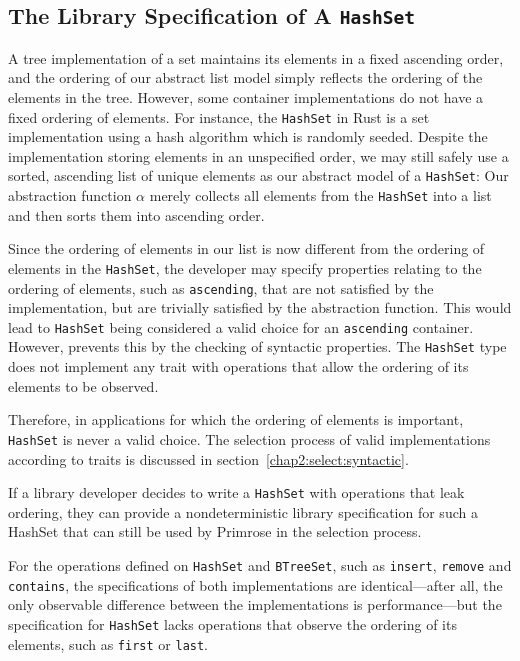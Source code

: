 \subsection{The Library Specification of A \texttt{HashSet}}
\label{lib:hashset}
A tree implementation of a set maintains its elements in a fixed ascending order, and the ordering of our abstract list model simply reflects the ordering of the elements in the tree. However, some container implementations
do not have a fixed ordering of elements. For instance, the \lstinline|HashSet| in Rust is a set implementation 
using a hash algorithm which is randomly seeded. Despite the implementation storing elements in an unspecified order, we may still safely 
use a sorted, ascending list of unique elements as our abstract model of a \lstinline|HashSet|: Our abstraction function $\alpha$ merely collects all elements from the \lstinline|HashSet| into a list and then sorts them into ascending order.

Since the ordering of elements in our list is now different from the ordering of elements in the \lstinline|HashSet|, the developer may specify 
properties relating to the ordering of elements, such as \lstinline|ascending|, that are not satisfied by the implementation, but are trivially satisfied by the 
abstraction function. This would lead to \lstinline|HashSet| being considered a valid choice for an \lstinline|ascending| container.
However, \Primrose{} prevents this by the checking of syntactic properties. The \lstinline|HashSet| type does not implement any trait with operations that allow the ordering of its elements to be observed. 

Therefore, in applications for which the ordering of elements is important, \lstinline|HashSet| is never a valid choice. The selection process of valid implementations according to traits is discussed in section~\ref{chap2:select:syntactic}. 

If a library developer decides to write a \lstinline|HashSet| with operations that leak ordering, they can provide a nondeterministic library specification for such a HashSet that can still be used by Primrose in the selection process.

For the operations defined on \lstinline|HashSet| and \lstinline|BTreeSet|, such as \lstinline|insert|, \lstinline|remove| and \lstinline|contains|,
 the specifications of both implementations are identical---after all, the only observable difference between the implementations is performance---but 
 the specification for \lstinline|HashSet| lacks operations that observe the ordering of its elements, such as \lstinline|first| or \lstinline|last|.

